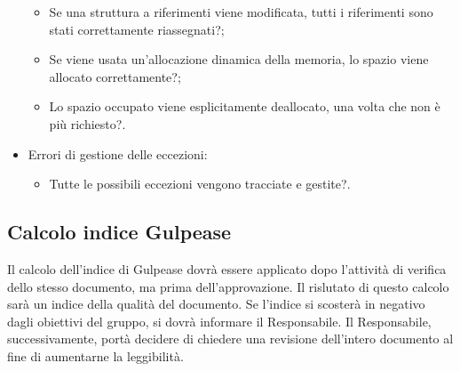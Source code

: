 \begin{itemize}
	\begin{itemize}
	\item Se una struttura a riferimenti viene modificata, tutti i riferimenti sono stati correttamente riassegnati?;
	\item Se viene usata un'allocazione dinamica della memoria, lo spazio viene allocato correttamente?;
	\item Lo spazio occupato viene esplicitamente deallocato, una volta che non è più richiesto?.
	\end{itemize}	
\item Errori di gestione delle eccezioni:
	\begin{itemize}
	\item Tutte le possibili eccezioni vengono tracciate e gestite?.
	\end{itemize}
\end{itemize}

\subsection{Calcolo indice Gulpease}
Il calcolo dell'indice di Gulpease dovrà essere applicato dopo l'attività di verifica dello stesso documento, ma prima dell'approvazione. Il rislutato di questo calcolo sarà un indice della qualità del documento. Se l'indice si scosterà in negativo dagli obiettivi del gruppo, si dovrà informare il Responsabile. Il Responsabile, successivamente, portà decidere di chiedere una revisione dell'intero documento al fine di aumentarne la leggibilità.


